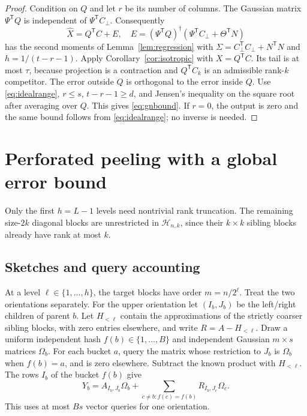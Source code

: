 \documentclass[11pt]{article}
\theoremstyle{remark}
\newcommand{\Hclass}{\mathcal H_{n,k}}
\begin{document}
\begin{proof}
Condition on $Q$ and let $r$ be its number of columns. The Gaussian matrix
$\Psi^{\mathsf T}Q$ is independent of $\Psi^{\mathsf T}C_\perp$.
Consequently
\[
 \widehat X=Q^{\mathsf T}C+E,
 \quad
 E=(\Psi^{\mathsf T}Q)^\dagger
      (\Psi^{\mathsf T}C_\perp+\Theta^{\mathsf T}N)
\]
has the second moments of Lemma~\ref{lem:regression} with
$\Sigma=C_\perp^{\mathsf T}C_\perp+N^{\mathsf T}N$ and
$h=1/(t-r-1)$. Apply Corollary~\ref{cor:isotropic} with
$X=Q^{\mathsf T}C$. Its tail is at most $\tau$, because projection is a
contraction and $Q^{\mathsf T}C_k$ is an admissible rank-$k$ competitor.
The error outside $Q$ is orthogonal to the error inside $Q$.
Use \eqref{eq:idealrange}, $r\le s$, $t-r-1\ge d$, and Jensen's inequality
on the square root after averaging over $Q$. This gives \eqref{eq:gnbound}.
If $r=0$, the output is zero and the same bound follows from
\eqref{eq:idealrange}; no inverse is needed.
\end{proof}

\section{Perforated peeling with a global error bound}\label{sec:algorithm}

Only the first $h=L-1$ levels need nontrivial rank truncation. The remaining
size-$2k$ diagonal blocks are unrestricted in $\Hclass$, since their
$k\times k$ sibling blocks already have rank at most $k$.

\subsection{Sketches and query accounting}

At a level $\ell\in\{1,\ldots,h\}$, the target blocks have order
$m=n/2^\ell$. Treat the two orientations separately. For the upper
orientation let $(I_b,J_b)$ be the left/right children of parent $b$.
Let $H_{<\ell}$ contain the approximations of the strictly coarser sibling
blocks, with zero entries elsewhere, and write $R=A-H_{<\ell}$.
Draw a uniform independent hash $f(b)\in\{1,\ldots,B\}$ and independent
Gaussian $m\times s$ matrices $\Omega_b$. For each bucket $a$, query the
matrix whose restriction to $J_b$ is $\Omega_b$ when $f(b)=a$, and is zero
elsewhere. Subtract the known product with $H_{<\ell}$.
The rows $I_b$ of the bucket $f(b)$ give
\begin{equation}\label{eq:rightsketch}
 Y_b=A_{I_b,J_b}\Omega_b+
      \sum_{c\ne b:f(c)=f(b)}R_{I_b,J_c}\Omega_c.
\end{equation}
This uses at most $Bs$ vector queries for one orientation.
\end{document}
